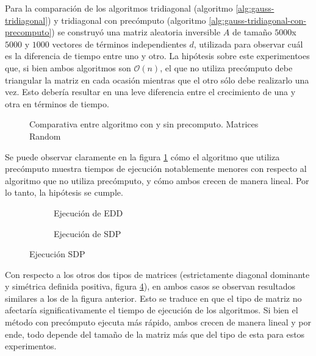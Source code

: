 Para la comparación de los algoritmos tridiagonal (algoritmo \ref{alg:gauss-tridiagonal}) y tridiagonal con precómputo (algoritmo \ref{alg:gauss-tridiagonal-con-precomputo}) se construyó una matriz aleatoria inversible $A$ de tamaño $5000$x$5000$ y $1000$ vectores de términos independientes $d$, utilizada para observar cuál es la diferencia de tiempo entre uno y otro.
La hipótesis sobre este experimentoes que, si bien ambos algoritmos son $\mathcal{O}(n)$, el que no utiliza precómputo debe triangular la matriz en cada ocasión mientras que el otro sólo debe realizarlo una vez.
Esto debería resultar en una leve diferencia entre el crecimiento de una y otra en términos de tiempo.

\begin{figure}[H]
   \centering
   
   \caption{Comparativa entre algoritmo con y sin precomputo. Matrices Random}
   \label{fig:4b-tridg-pre-random-2}
\end{figure}

Se puede observar claramente en la figura \ref{fig:4b-tridg-pre-random-2} cómo el algoritmo que utiliza precómputo muestra tiempos de ejecución notablemente menores con respecto al algoritmo que no utiliza precómputo, y cómo ambos crecen de manera lineal. Por lo tanto, la hipótesis se cumple.

\begin{figure}[H]
   \begin{subfigure}{.5\textwidth}
      \centering
      
      \caption{Ejecución de EDD}
      \label{fig:4b-tridg-pre-edd-2}
   \end{subfigure}%
   \begin{subfigure}{.5\textwidth}
      \centering
      
      \caption{Ejecución de SDP}
      \label{fig:4b-tridg-pre-sdp-2}
   \end{subfigure}
   \caption{Ejecución SDP}
   \label{fig:fig_con_sin_pre-2}
\end{figure}

Con respecto a los otros dos tipos de matrices (estrictamente diagonal dominante y simétrica definida positiva, figura \ref{fig:fig_con_sin_pre-2}), en ambos  casos se observan resultados similares a los de la figura anterior. Esto se traduce en que el tipo de matriz no afectaría significativamente el tiempo de ejecución de los algoritmos.
Si bien el método con precómputo ejecuta más rápido, ambos crecen de manera lineal y por ende, todo depende del tamaño de la matriz más que del tipo de esta para estos experimentos.